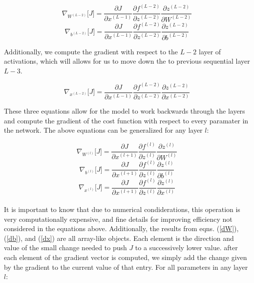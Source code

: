 \documentclass[12pt,letterpaper]{article}
\begin{document}
\begin{equation}
\nabla_{W^{(L-2)}} \Big[ J \Big] = 
\frac{\partial J}{\partial x^{(L-1)}} \frac{\partial f^{(L-2)}}{\partial z^{(L-2)}} \frac{\partial z^{(L-2)}}{\partial W^{(L-2)}}
\end{equation}
\begin{equation}
\nabla_{b^{(L-2)}} \Big[ J \Big] = 
\frac{\partial J}{\partial x^{(L-1)}} \frac{\partial f^{(L-2)}}{\partial z^{(L-2)}} \frac{\partial z^{(L-2)}}{\partial b^{(L-2)}}
\end{equation}

Additionally, we compute the gradient with respect to the $L-2$ layer of activations, which will allows for us to move down the to previous sequential layer $L-3$.

\begin{equation}
\nabla_{x^{(L-2)}} \Big[ J \Big] = 
\frac{\partial J}{\partial x^{(L-1)}} \frac{\partial f^{(L-2)}}{\partial z^{(L-2)}} \frac{\partial z^{(L-2)}}{\partial x^{(L-2)}}
\end{equation} 

These three equations allow for the model to work backwards through the layers and compute the gradient of the cost function with respect to every paramater in the network. The above equations can be generalized for any layer $l$:

\begin{equation}
\label{dW}
\nabla_{W^{(l)}} \big[ J \big] = 
\frac{\partial J}{\partial x^{(l+1)}} \frac{\partial f^{(l)}}{\partial z^{(l)}} \frac{\partial z^{(l)}}{\partial W^{(l)}}
\end{equation}
\begin{equation}
\label{db}
\nabla_{b^{(l)}} \big[ J \big] = 
\frac{\partial J}{\partial x^{(l+1)}} \frac{\partial f^{(l)}}{\partial z^{(l)}} \frac{\partial z^{(l)}}{\partial b^{(l)}}
\end{equation}
\begin{equation}
\label{dx}
\nabla_{x^{(l)}} \big[ J \big] = 
\frac{\partial J}{\partial x^{(l+1)}} \frac{\partial f^{(l)}}{\partial z^{(l)}} \frac{\partial z^{(l)}}{\partial x^{(l)}}
\end{equation}

\paragraph*{}It is important to know that due to numerical condiderations, this operation is very computationally expensive, and fine details for improving efficiency not considered in the equations above. Additionally, the results from eqns. (\ref{dW}), (\ref{db}), and (\ref{dx}) are all array-like objects. Each element is the direction and value of the small change needed to push $J$ to a successively lower value. after each element of the gradient vector is computed, we simply add the change given by the gradient to the current value of that entry. For all parameters in any layer $l$:
\end{document}

